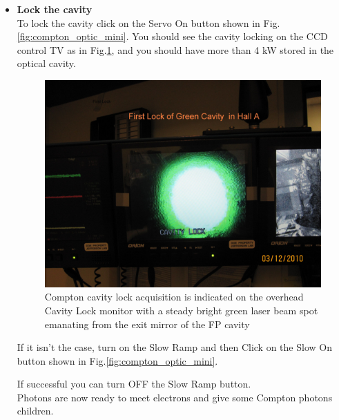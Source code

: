 \begin{itemize}
\item {\bf Lock the cavity}\\
	
 To lock the cavity click on the Servo On button shown in Fig.\ref{fig:compton_optic_mini}.
You should see the cavity locking
on the CCD control TV as in  Fig.\ref{fig:compton_cavity_lock}, and you should have more than 4 kW stored in the optical cavity.
\begin{figure}[htp]
    \begin{center}
        \includegraphics*[angle=0,width=\textwidth]{compton_cavity_lock}
    \end{center}
    \caption[compton:cavity lock]{Compton cavity lock acquisition is indicated on the overhead Cavity Lock monitor with a steady bright green laser beam spot emanating from the exit mirror of the FP cavity}
    \label{fig:compton_cavity_lock}
\end{figure}

If it isn't the case, turn on the Slow Ramp and then Click on the Slow On button shown in 
Fig.\ref{fig:compton_optic_mini}.

    If successful you can turn OFF the Slow Ramp button.\\
    Photons are now ready to meet electrons and give some Compton photons children.\\


\end{itemize}
